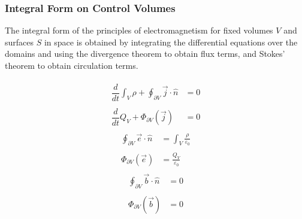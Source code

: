 \documentclass[letterpaper,10pt,english]{jupyterBook}
\begin{document}
\subsubsection{Integral Form on Control Volumes}
\label{\detokenize{ch/principles-vacuum:integral-form-on-control-volumes}}\label{\detokenize{ch/principles-vacuum:classical-electromagnetism-principles-integral-control-volume}}
\sphinxAtStartPar
The integral form of the principles of electromagnetism for fixed volumes \(V\) and surfaces \(S\) in space is obtained by integrating the differential equations over the domains and using the divergence theorem to obtain flux terms, and Stokes’ theorem to obtain circulation terms.

\sphinxAtStartPar
{}
\begin{equation*}
\begin{split}\begin{aligned}
    \dfrac{d}{dt} \int_{V} \rho + \oint_{\partial V} \vec{j} \cdot \hat{n} & = 0 \\ \\
    \dfrac{d}{dt} Q_V + \Phi_{\partial V}\left( \vec{j} \right) & = 0
\end{aligned}\end{split}
\end{equation*}
\sphinxAtStartPar
{}
\begin{equation*}
\begin{split}\begin{aligned}
    \oint_{\partial V} \vec{e} \cdot \hat{n} & = \int_{V} \frac{\rho}{\varepsilon_0} \\ \\
    \Phi_{\partial V}(\vec{e}) & = \frac{Q_V}{\varepsilon_0}
\end{aligned}\end{split}
\end{equation*}
\sphinxAtStartPar
{}
\begin{equation*}
\begin{split}\begin{aligned}
    \oint_{\partial V} \vec{b} \cdot \hat{n} & = 0 \\  \\
    \Phi_{\partial V}\left( \vec{b} \right) & = 0
\end{aligned}\end{split}
\end{equation*}
\end{document}
